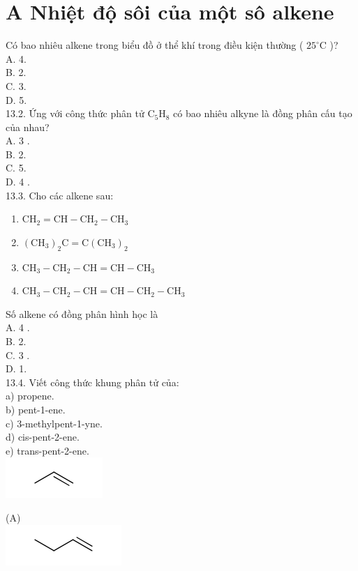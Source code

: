 \documentclass[10pt]{article}
\begin{document}
\section*{A Nhiệt độ sôi của một sô alkene}
Có bao nhiêu alkene trong biểu đồ ở thể khí trong điều kiện thường ( $25^{\circ} \mathrm{C}$ )?\\
A. 4.\\
B. 2.\\
C. 3.\\
D. 5.\\
13.2. Ứng với công thức phân tử $\mathrm{C}_{5} \mathrm{H}_{8}$ có bao nhiêu alkyne là đồng phân cấu tạo của nhau?\\
A. 3 .\\
B. 2.\\
C. 5.\\
D. 4 .\\
13.3. Cho các alkene sau:

\begin{enumerate}
  \item $\mathrm{CH}_{2}=\mathrm{CH}-\mathrm{CH}_{2}-\mathrm{CH}_{3}$
  \item $\left(\mathrm{CH}_{3}\right)_{2} \mathrm{C}=\mathrm{C}\left(\mathrm{CH}_{3}\right)_{2}$
  \item $\mathrm{CH}_{3}-\mathrm{CH}_{2}-\mathrm{CH}=\mathrm{CH}-\mathrm{CH}_{3}$
  \item $\mathrm{CH}_{3}-\mathrm{CH}_{2}-\mathrm{CH}=\mathrm{CH}-\mathrm{CH}_{2}-\mathrm{CH}_{3}$
\end{enumerate}

Số alkene có đồng phân hình học là\\
A. 4 .\\
B. 2.\\
C. 3 .\\
D. 1.\\
13.4. Viết công thức khung phân tử của:\\
a) propene.\\
b) pent-1-ene.\\
c) 3-methylpent-1-yne.\\
d) cis-pent-2-ene.\\
e) trans-pent-2-ene.\\
\includegraphics{smile-ac40d4a16edb3ea36ea9dcec8f6a357620ce47c4}

(A)\\
\includegraphics{smile-f089e0483638207b9da967dfa71715be0f91ac5e}
\end{document}
